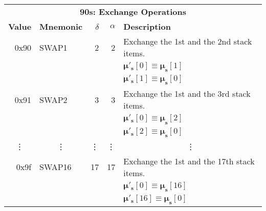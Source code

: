\documentclass[9pt,oneside]{amsart}
\begin{document}
\begin{tabularx}{\textwidth}{rlrrX}
\toprule
\multicolumn{5}{c}{\textbf{90s: Exchange Operations}} \vspace{5pt} \\
\textbf{Value} & \textbf{Mnemonic} & $\delta$ & $\alpha$ & \textbf{Description} \vspace{5pt} \\
0x90 & {\small SWAP1} & 2 & 2 & Exchange the 1st and the 2nd stack items. \\
&&&& $\boldsymbol{\mu}'_\mathbf{s}[0] \equiv \boldsymbol{\mu}_\mathbf{s}[1]$ \\
&&&& $\boldsymbol{\mu}'_\mathbf{s}[1] \equiv \boldsymbol{\mu}_\mathbf{s}[0]$ \\
\midrule
0x91 & {\small SWAP2} & 3 & 3 & Exchange the 1st and the 3rd stack items. \\
&&&& $\boldsymbol{\mu}'_\mathbf{s}[0] \equiv \boldsymbol{\mu}_\mathbf{s}[2]$ \\
&&&& $\boldsymbol{\mu}'_\mathbf{s}[2] \equiv \boldsymbol{\mu}_\mathbf{s}[0]$ \\
\midrule
\multicolumn{1}{c}{\vdots} & \multicolumn{1}{c}{\vdots} & \vdots & \vdots & \multicolumn{1}{c}{\vdots} \\
\midrule
0x9f & {\small SWAP16} & 17 & 17 & Exchange the 1st and the 17th stack items. \\
&&&& $\boldsymbol{\mu}'_\mathbf{s}[0] \equiv \boldsymbol{\mu}_\mathbf{s}[16]$ \\
&&&& $\boldsymbol{\mu}'_\mathbf{s}[16] \equiv \boldsymbol{\mu}_\mathbf{s}[0]$ \\
\bottomrule
\end{tabularx}
\end{document}
